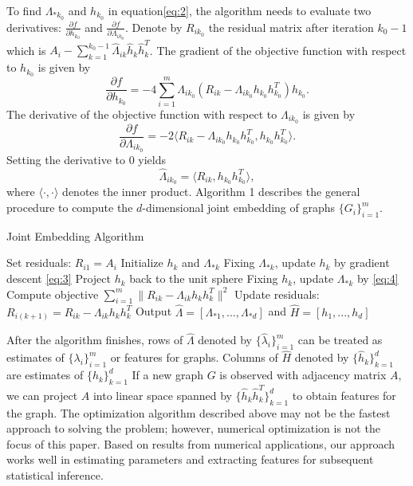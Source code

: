 \documentclass[10pt,journal,compsoc]{IEEEtran}
\begin{document}
\noindent To find $\Lambda_{*k_0}$ and $h_{k_0}$ in equation\ref{eq:2}, the algorithm needs to evaluate two derivatives: $\frac{\partial f}{\partial h_{k_0}}$ and $\frac{\partial f}{\partial \Lambda_{i k_0}}$. Denote by $R_{ik_0}$ the residual matrix after iteration $k_0-1$ which is $A_i- \sum\limits_{k=1}^{k_0-1}\hat{\Lambda}_{ik} \hat{h}_{k} \hat{h}_{k}^T$. The gradient of the objective function with respect to $h_{k_0}$ is given by
\begin{equation} \label{eq:3}
\frac{\partial f}{\partial h_{k_0}} = -4\sum\limits_{i=1}^{m}  \Lambda_{ik_0} (R_{ik}-\Lambda_{ik_0} h_{k_0} h_{k_0}^T)  h_{k_0}.
\end{equation}
The derivative of the objective function with respect to $\Lambda_{i k_0}$ is given by
\[\frac{\partial f}{\partial \Lambda_{i k_0}}= -2 \langle R_{ik}-\Lambda_{ik_0} h_{k_0} h_{k_0}^T,h_{k_0} h_{k_0}^T\rangle.\]
Setting the derivative to $0$ yields
\begin{equation}  \label{eq:4}
\hat{\Lambda}_{i k_0} = \langle R_{ik}, h_{k_0} h_{k_0}^T \rangle,
\end{equation}
where $\langle \cdot , \cdot \rangle$ denotes the inner product. Algorithm 1 describes the general procedure to compute the $d$-dimensional joint embedding of graphs $\{G_i\}_{i=1}^m$. 
\begin{algorithm}
	\caption{Joint Embedding Algorithm}
	\begin{algorithmic}[1]
		\State Set residuals: $R_{i1}=A_i$
		\State Initialize $h_k$ and $\Lambda_{*k}$ 
		\State Fixing $\Lambda_{*k}$, update $h_k$ by gradient descent \eqref{eq:3}
		\State Project $h_k$ back to the unit sphere
		\State Fixing $h_k$, update $\Lambda_{*k}$ by \eqref{eq:4}
		\State Compute objective $\sum\limits_{i=1}^{m} \| R_{ik}-  \Lambda_{ik} h_k h_k^T \|^2$
		\EndWhile
		\State Update residuals: $R_{i(k+1)}=R_{ik}- \Lambda_{ik} h_kh_k^T$
		\EndFor
		\State Output $\hat{\Lambda}=[\Lambda_{*1},...,\Lambda_{*d}]$ and $\hat{H}=[h_1,...,h_d]$
		\EndProcedure
	\end{algorithmic}
\end{algorithm}
After the algorithm finishes, rows of $\hat{\Lambda}$ denoted by $\{\hat{\lambda}_i\}_{i=1}^m$ can be treated as estimates of $\{\lambda_i\}_{i=1}^m$ or features for graphs. Columns of $\hat{H}$ denoted by $\{\hat{h}_k\}_{k=1}^d$ are estimates of $\{h_k\}_{k=1}^d$ If a new graph $G$ is observed with adjacency matrix $A$, we can project $A$ into linear space spanned by $\{\hat{h}_k \hat{h}_k^T\}_{k=1}^{d}$ to obtain features for the graph. The optimization algorithm described above may not be the fastest approach to solving the problem; however, numerical optimization is not the focus of this paper. Based on results from numerical applications, our approach works well in estimating parameters and extracting features for subsequent statistical inference.
\end{document}
